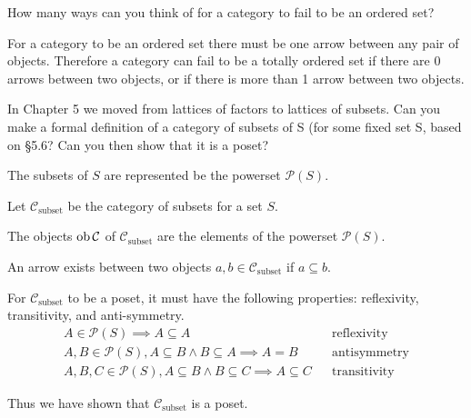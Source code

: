\begin{ttta}
How many ways can you think of for a category to fail to be an
ordered set?
\end{ttta}
\begin{proofitem}
\item For a category to be an ordered set there must be one arrow between any
    pair of objects. Therefore a category can fail to be a totally ordered set
    if there are 0 arrows between two objects, or if there is more than 1 arrow
    between two objects.
\end{proofitem}

\begin{ttta}
In Chapter 5 we moved from lattices of factors to lattices of subsets.
Can you make a formal definition of a category of subsets of S (for some fixed
set S, based on \S 5.6? Can you then show that it is a poset?
\end{ttta}
\begin{proofitem}
\item The subsets of $S$ are represented be the powerset $\mathscr{P}(S)$.
\item Let $\mathcal{C}_\text{subset}$ be the category of subsets for a set $S$.
\item The objects $\text{ob}\thinspace\mathcal{C}{}$ of $\mathcal{C}_\text{subset}$ are the elements of
    the powerset $\mathscr{P}(S)$.
\item An arrow exists between two objects $a, b \in \mathcal{C}_\text{subset}$
    if $a\subseteq b$.
\item For $\mathcal{C}_\text{subset}$ to be a poset, it must have the following
    properties: reflexivity, transitivity, and anti-symmetry.
\setcounter{equation}{0}
\begin{align}
    A \in \mathscr{P}(S) \implies A\subseteq A &&\text{reflexivity}\\
    A,B \in \mathscr{P}(S), A\subseteq B \land B \subseteq A \implies A=B  &&\text{antisymmetry}\\
    A,B,C \in \mathscr{P}(S), A \subseteq B \land B \subseteq C \implies A
    \subseteq C&&\text{transitivity}
\end{align}
\item Thus we have shown that $\mathcal{C}_\text{subset}$ is a poset.
\end{proofitem}
